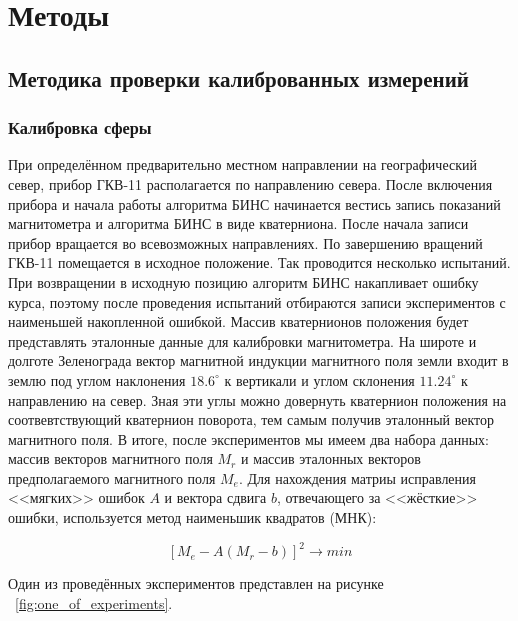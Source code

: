 \documentclass[a4paper,12pt]{article}
\begin{document}
\section{Методы}
\subsection{Методика проверки калиброванных измерений}
\subsubsection{Калибровка сферы}
При определённом предварительно местном направлении на географический север, прибор ГКВ-11 располагается по направлению севера. После включения прибора и начала работы алгоритма БИНС начинается вестись запись показаний магнитометра и алгоритма БИНС в виде кватерниона. После начала записи прибор вращается во всевозможных направлениях. По завершению вращений ГКВ-11 помещается в исходное положение. Так проводится несколько испытаний. При возвращении в исходную позицию алгоритм БИНС накапливает ошибку курса, поэтому после проведения испытаний отбираются записи экспериментов с наименьшей накопленной ошибкой. Массив кватернионов положения будет представлять эталонные данные для калибровки магнитометра. На широте и долготе Зеленограда вектор магнитной индукции магнитного поля земли входит в землю под углом наклонения  $18.6^\circ$ к вертикали и углом склонения $11.24^\circ$ к направлению на север. Зная эти углы можно  довернуть кватернион положения на соотвевтствующий кватернион поворота, тем самым получив эталонный вектор магнитного поля. 
В итоге, после экспериментов мы имеем два набора данных: массив векторов магнитного поля $M_r$ и массив эталонных векторов предполагаемого магнитного поля $M_e$. Для нахождения матриы исправления <<мягких>>  ошибок $A$ и вектора сдвига $b$, отвечающего за <<жёсткие>>  ошибки, используется метод наименьшик квадратов (МНК):

\[ \left[ M_e - A\left(
M_r - b \right)
\right]^2 \rightarrow min
\]

Один из проведённых экспериментов представлен на рисунке ~\ref{fig:one_of_experiments}.
\end{document}
